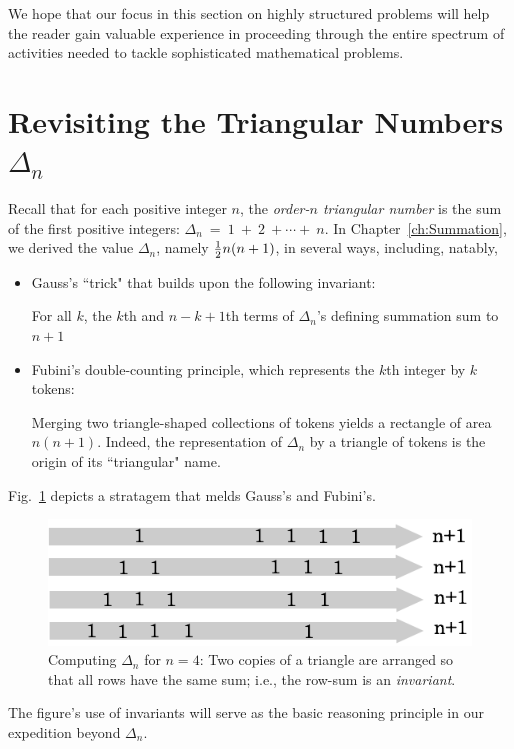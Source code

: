 \smallskip

We hope that our focus in this section on highly structured problems will help the reader gain valuable experience in proceeding through the entire spectrum of activities needed to tackle sophisticated mathematical problems.


\section{Revisiting the Triangular Numbers $\Delta_n$}

 

Recall that for each positive integer $n$, the {\it order-$n$ triangular number} is the sum of the  first positive integers: $\Delta_n \ = \ 1 \ + \ 2 \ + \cdots + \ n$.  In Chapter~\ref{ch:Summation}, we derived the value $\Delta_n$, namely ${1 \over 2}n(n+1)$, in several ways, including, natably,
\begin{itemize}
\item
Gauss's ``trick" that builds upon the following invariant: 

For all $k$, the $k$th and $n-k+1$th terms of $\Delta_n$'s defining summation sum to $n+1$ 
\item 
Fubini's double-counting principle, which represents the $k$th integer by $k$ tokens:

Merging two triangle-shaped collections of tokens yields a rectangle of area $n(n+1)$.  Indeed, the representation of $\Delta_n$ by a triangle of tokens is the origin of its ``triangular" name.
\end{itemize}
Fig.~\ref{fig:Tetrahedral2} depicts a stratagem that melds Gauss's and Fubini's.
\begin{figure}[h]
\begin{center}
        \includegraphics[scale=0.4]{FiguresArithmetic/appTetrahedral2}
        \caption{Computing $\Delta_n$ for $n=4$: Two copies of a triangle are arranged so that all rows have the same sum; i.e., the row-sum is an {\em invariant}.}
        \label{fig:Tetrahedral2}
\end{center}
\end{figure}
The figure's use of invariants will serve as the basic reasoning principle in our expedition beyond $\Delta_n$.


